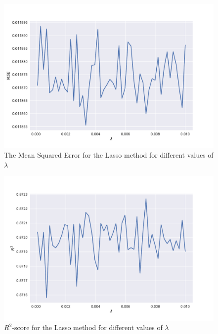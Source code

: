 \documentclass[a4paper,10pt,english]{article}
\begin{document}
\begin{figure}[h!]
	\centering 
	\includegraphics[scale=0.6]{../results/part_e_reg_MSE.pdf}
	\caption{The Mean Squared Error for the Lasso method for different values of $\lambda$}
	\label{part_e_MSE}
\end{figure}

\begin{figure}[h!]
	\centering 
	\includegraphics[scale=0.6]{../results/part_e_reg_R2.pdf}
	\caption{$R^2$-score for the Lasso method for different values of $\lambda$}
	\label{part_e_R2}
\end{figure}
\end{document}
